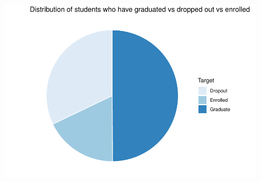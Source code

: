 \documentclass[
]{article}
\begin{document}
\includegraphics{midterm_files/figure-latex/unnamed-chunk-15-1.pdf}
\end{document}
